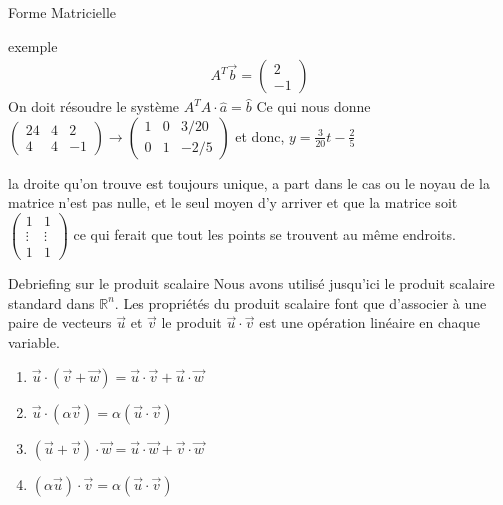 \begin{parag}{Forme Matricielle}
\begin{subparag}{exemple}
\begin{align*}
                    A^T \vec{b} = \begin{pmatrix}
                        2 \\ -1
                    \end{pmatrix}
                \end{align*}
                On doit résoudre le système $A^TA \cdot \hat{a} = \hat{b} $
                Ce qui nous donne
                $\left(
                \begin{array}{cc|c}
                    24 &4 & 2  \\
                     4&4 & -1 
                \end{array}\right) \to \left(
                \begin{array}{cc|c}
                    1 &0 & 3/20  \\
                     0&1 & -2/5 
                \end{array}\right) $ et donc, $y = \frac{3}{20}t - \frac{2}{5}$
            \end{subparag}
            \begin{framedremark}
                la droite qu'on trouve est toujours unique, a part dans le cas ou le noyau de la matrice n'est pas nulle, et le seul moyen d'y arriver et que la matrice soit $\begin{pmatrix}
                    1 &1 \\
                    \vdots  & \vdots\\
                    1 & 1
                \end{pmatrix}$ ce qui ferait que tout les points se trouvent au même endroits.
            \end{framedremark}
        \end{parag}
        \begin{parag}{Debriefing sur le produit scalaire}
            Nous avons utilisé jusqu'ici le produit scalaire standard dans $\mathbb{R}^n$. Les propriétés du produit scalaire font que d'associer à une paire de vecteurs $\vec{u}$ et $\vec{v}$ le produit $\vec{u}\cdot \vec{v}$ est une opération linéaire en chaque variable.
            \begin{enumerate}
                \item $\vec{u}\cdot(\vec{v}+\vec{w}) = \vec{u}\cdot\vec{v} + \vec{u}\cdot\vec{w}$
                \item $\vec{u}\cdot(\alpha\vec{v}) = \alpha(\vec{u}\cdot \vec{v})$
                \item $(\vec{u}+\vec{v}) \cdot \vec{w} = \vec{u}\cdot\vec{w} + \vec{v}\cdot \vec{w}$
                \item $(\alpha\vec{u})\cdot \vec{v} = \alpha(\vec{u}\cdot\vec{v})$
            \end{enumerate}
        \end{parag}
